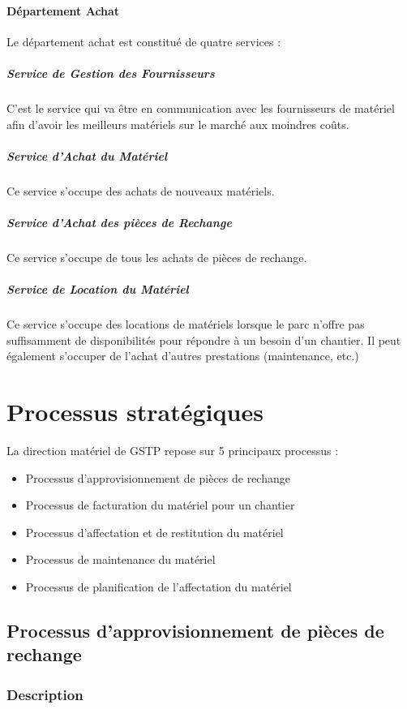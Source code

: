             \paragraph{Département Achat}
                Le département achat est constitué de quatre services :

                \subparagraph{Service de Gestion des Fournisseurs}
	                C'est le service qui va être en communication avec les fournisseurs de matériel afin d'avoir les meilleurs matériels sur le marché aux moindres coûts.
                \subparagraph{Service d'Achat du Matériel}
	                Ce service s'occupe des achats de nouveaux matériels.
                \subparagraph{Service d'Achat des pièces de Rechange}
	                Ce service s'occupe de tous les achats de pièces de rechange.
                \subparagraph{Service de Location du Matériel}
	                Ce service s'occupe des locations de matériels lorsque le parc n'offre pas suffisamment de disponibilités pour répondre à un besoin d'un chantier. Il peut également s'occuper de l'achat d'autres prestations (maintenance, etc.)


\section{Processus stratégiques}
		La direction matériel de GSTP repose sur 5 principaux processus :
		\begin{itemize}
				\item Processus d'approvisionnement de pièces de rechange
				\item Processus de facturation du matériel pour un chantier
				\item Processus d'affectation et de restitution du matériel
				\item Processus de maintenance du matériel
				\item Processus de planification de l'affectation du matériel
    \end{itemize}


		\subsection{Processus d'approvisionnement de pièces de rechange}
				\subsubsection{Description}
				
